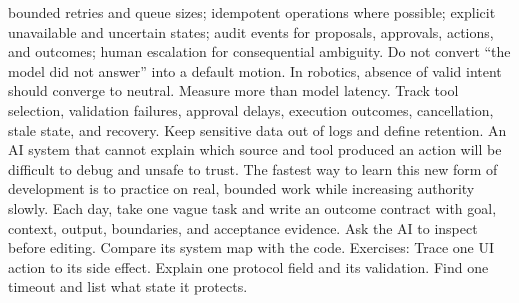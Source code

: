 \markdownRendererUlItem bounded retries and queue sizes;\markdownRendererUlItemEnd 
\markdownRendererUlItem idempotent operations where possible;\markdownRendererUlItemEnd 
\markdownRendererUlItem explicit unavailable and uncertain states;\markdownRendererUlItemEnd 
\markdownRendererUlItem audit events for proposals, approvals, actions, and outcomes;\markdownRendererUlItemEnd 
\markdownRendererUlItem human escalation for consequential ambiguity.\markdownRendererUlItemEnd 
\markdownRendererUlEnd \markdownRendererInterblockSeparator
{}Do not convert “the model did not answer” into a default motion. In robotics,\markdownRendererSoftLineBreak
{}absence of valid intent should converge to neutral.\markdownRendererInterblockSeparator
{}
\markdownRendererSectionEnd \markdownRendererSectionBegin
{}\markdownRendererInterblockSeparator
{}Measure more than model latency. Track tool selection, validation failures,\markdownRendererSoftLineBreak
{}approval delays, execution outcomes, cancellation, stale state, and recovery.\markdownRendererSoftLineBreak
{}Keep sensitive data out of logs and define retention. An AI system that cannot\markdownRendererSoftLineBreak
{}explain which source and tool produced an action will be difficult to debug and\markdownRendererSoftLineBreak
{}unsafe to trust.\markdownRendererInterblockSeparator
{}\markdownRendererThematicBreak{}\markdownRendererInterblockSeparator
{}
\markdownRendererSectionEnd 
\markdownRendererSectionEnd \markdownRendererSectionBegin
{}\markdownRendererInterblockSeparator
{}The fastest way to learn this new form of development is to practice on real,\markdownRendererSoftLineBreak
{}bounded work while increasing authority slowly.\markdownRendererInterblockSeparator
{}\markdownRendererSectionBegin
{}\markdownRendererInterblockSeparator
{}Each day, take one vague task and write an outcome contract with goal, context,\markdownRendererSoftLineBreak
{}output, boundaries, and acceptance evidence. Ask the AI to inspect before\markdownRendererSoftLineBreak
{}editing. Compare its system map with the code.\markdownRendererParagraphSeparator
{}Exercises:\markdownRendererInterblockSeparator
{}\markdownRendererOlBegin
{}Trace one UI action to its side effect.\markdownRendererOlItemEnd 
{}Explain one protocol field and its validation.\markdownRendererOlItemEnd 
{}Find one timeout and list what state it protects.\markdownRendererOlItemEnd 
